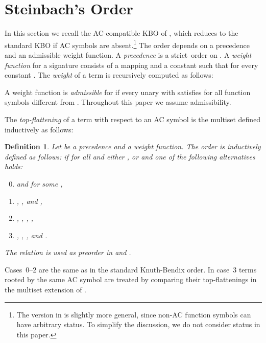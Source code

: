 \documentclass{tlp}
\newtheorem{definition}[theorem]{Definition}
\newcommand{\proper}{proper}
\renewcommand{\proper}{strict}
\begin{document}
\section{Steinbach's Order}
\label{Steinbach}

In this section we recall the AC-compatible KBO  of
, which reduces to the standard KBO if AC symbols are
absent.\footnote{The version in \cite{S90} is slightly more general, since non-AC
function symbols can have arbitrary status. To simplify the discussion, we
do not consider status in this paper.}
The order  depends on a precedence
and an admissible weight function.
A \emph{precedence}  is a \proper\ order on .
A \emph{weight function}  for a signature  consists of
a mapping  and a constant  such that 
 for every constant .
The \emph{weight} of a term  is recursively computed as follows:


\bigskip

\noindent
A weight function  is \emph{admissible} for  if 
every unary  with  satisfies  for all
function symbols  different from .
Throughout this paper we assume admissibility.



The \emph{top\hyp flattening} \cite{R02}
of a term  with respect to an AC symbol 
is the multiset  defined inductively as follows:


\begin{definition}
\label{def:Steinbach}
Let  be a precedence and  a weight function.
The order  is inductively defined
as follows:  if
 for all  and either , or
 and one of the following alternatives holds:
\begin{enumerate}
\setcounter{enumi}{-1}
\item
 and  for some ,
\smallskip
\item
, , and ,
\smallskip
\item
, , ,
,
\smallskip
\item
, , ,
and .
\end{enumerate}
\smallskip
The relation  is used as preorder in
 and .
\end{definition}

Cases~0--2 are the same as in the standard Knuth-Bendix order.
In case~3 terms rooted by the same AC symbol  are treated by
comparing their top\hyp flattenings in the multiset extension of
.
\end{document}
